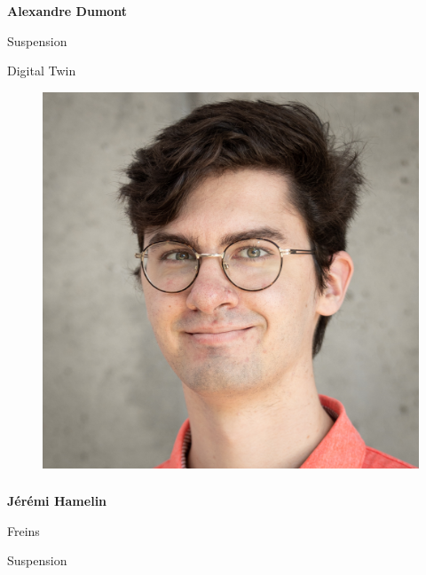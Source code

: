 \documentclass[a0paper,portrait]{baposter}
\begin{document}
\begin{poster}
{\subsubsection*{}
\vspace{2mm}
\textbf{Alexandre Dumont}

Suspension

Digital Twin

\begin{figure}
\includegraphics[width=.9\linewidth]{img/membres/Jérémi-Hamelin-3.jpg} 
\end{figure}
\subsubsection*{}
\vspace{2mm}
\textbf{Jérémi Hamelin}

Freins

Suspension

\vspace{1cm}
}


\end{poster}
\end{document}
